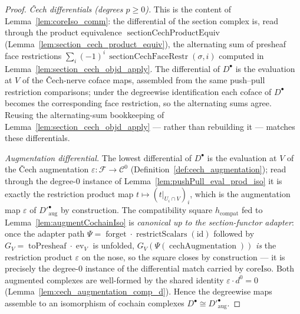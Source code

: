 \begin{proof}
  \emph{{\v C}ech differentials (degrees \(p \geq 0\)).} This is the content of
  Lemma~\ref{lem:coreIso_comm}: the differential of the section complex is, read through the
  product equivalence \(\operatorname{sectionCechProductEquiv}\)
  (Lemma~\ref{lem:section_cech_product_equiv}), the alternating sum of presheaf face
  restrictions \(\sum_i (-1)^i\, \operatorname{sectionCechFaceRestr}(\sigma, i)\) computed in
  Lemma~\ref{lem:section_cech_objd_apply}. The differential of \(D^\bullet\) is the
  evaluation at \(V\) of the {\v C}ech-nerve coface maps, assembled from the same push--pull
  restriction comparisons; under the degreewise identification each coface of \(D^\bullet\)
  becomes the corresponding face restriction, so the alternating sums agree. Reusing the
  alternating-sum bookkeeping of Lemma~\ref{lem:section_cech_objd_apply} --- rather than
  rebuilding it --- matches these differentials.

  \emph{Augmentation differential.} The lowest differential of \(D^\bullet\) is the evaluation
  at \(V\) of the {\v C}ech augmentation \(\varepsilon : \mathcal{F} \to \mathcal{C}^0\)
  (Definition~\ref{def:cech_augmentation}); read through the degree-\(0\) instance of
  Lemma~\ref{lem:pushPull_eval_prod_iso} it is exactly the restriction product map
  \(t \mapsto (t|_{U_i \cap V})_i\), which is the augmentation map \(\varepsilon\) of
  \(D'^\bullet_{\mathrm{aug}}\) by construction. The compatibility square \(h_{\mathrm{compat}}\)
  fed to Lemma~\ref{lem:augmentCochainIso} is \emph{canonical up to the section-functor
  adapter}: once the adapter path \(\Psi = \operatorname{forget} \cdot
  \operatorname{restrictScalars}(\mathrm{id})\) followed by \(G_V = \operatorname{toPresheaf}
  \cdot \operatorname{ev}_{V}\) is unfolded, \(G_V(\Psi(\operatorname{cechAugmentation}))\)
  \emph{is} the restriction product \(\varepsilon\) on the nose, so the square closes by
  construction --- it is precisely the degree-\(0\) instance of the differential match carried
  by \(\mathrm{coreIso}\). Both augmented
  complexes are well-formed by the shared identity \(\varepsilon \cdot d^0 = 0\)
  (Lemma~\ref{lem:cech_augmentation_comp_d}). Hence the degreewise maps assemble to an
  isomorphism of cochain complexes \(D^\bullet \cong D'^\bullet_{\mathrm{aug}}\).
\end{proof}

